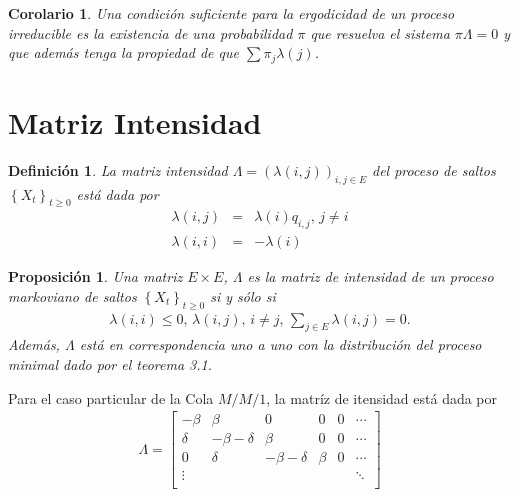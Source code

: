 \documentclass{article}
\newtheorem{Def}{Definición}
\newtheorem{Prop}{Proposición}
\newtheorem{Cor}{Corolario}
\begin{document}
\begin{Cor}\label{Cor.4.4}
Una condici\'on suficiente para la ergodicidad de un proceso irreducible es la existencia de una probabilidad $\pi$ que resuelva el sistema $\pi\Lambda=0$ y que adem\'as tenga la propiedad de que $\sum\pi_{j}\lambda\left(j\right)$.
\end{Cor}

%
\section{Matriz Intensidad}
%


\begin{Def}
La matriz intensidad
$\Lambda=\left(\lambda\left(i,j\right)\right)_{i,j\in E}$ del proceso de saltos $\left\{X_{t}\right\}_{t\geq0}$ est\'a dada por
\begin{eqnarray*}
\lambda\left(i,j\right)&=&\lambda\left(i\right)q_{i,j}\textrm{,    }j\neq i\\
\lambda\left(i,i\right)&=&-\lambda\left(i\right)
\end{eqnarray*}
\end{Def}


\begin{Prop}\label{Prop.3.1}
Una matriz $E\times E$, $\Lambda$ es la matriz de intensidad de un proceso markoviano de saltos $\left\{X_{t}\right\}_{t\geq0}$ si y s\'olo si
\begin{eqnarray*}
\lambda\left(i,i\right)\leq0\textrm{, }\lambda\left(i,j\right)\textrm{,   }i\neq j\textrm{,  }\sum_{j\in E}\lambda\left(i,j\right)=0.
\end{eqnarray*}
Adem\'as, $\Lambda$ est\'a en correspondencia uno a uno con la
distribuci\'on del proceso minimal dado por el teorema 3.1.
\end{Prop}


Para el caso particular de la Cola $M/M/1$, la matr\'iz de itensidad est\'a dada por
\begin{eqnarray*}
\Lambda=\left[\begin{array}{cccccc}
-\beta & \beta & 0 &0 &0& \cdots\\
\delta & -\beta-\delta & \beta & 0 & 0 &\cdots\\
0 & \delta & -\beta-\delta & \beta & 0 &\cdots\\
\vdots & & & & & \ddots\\
\end{array}\right]
\end{eqnarray*}
\end{document}
